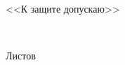 \begin{ESKDtitlePage}
  \begin{center}
    \envDiplomMinistr

    \envDiplomEducation

    \envDiplomUniversity

    \envDiplomCathedra
  \end{center}
  
  \vfill

  \begin{flushright}
    \begin{minipage}[t]{.45\textwidth}
      <<К защите допускаю>>

      \envDiplomHeadDepartmentInfo

      \underline{\hspace{3cm}} \envDiplomHeadDepartmentInitials~\envDiplomHeadCathedraSurname

      \envDiplomDateInput
    \end{minipage}
  \end{flushright}
  
  \vfill

  \begin{center}
    \envDiplomTitleUppercased

    \envDiplomDocumentTitle
  \end{center}

  \vfill

  \begin{center}
    \envCode
    
    Листов \pageref{LastPage}
  \end{center}

  \vfill

  

  \vfill

  \begin{center}
    \ESKDtheYear
  \end{center}
\end{ESKDtitlePage}
  